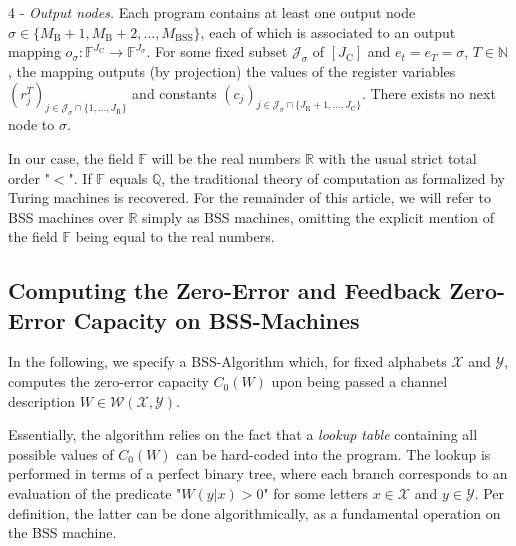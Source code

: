 \documentclass[conference]{IEEEtran}
\def\X{{\mathcal X}}
\def\Y{{\mathcal Y}}
\def\J{{\mathcal J}}
\def\W{{\mathcal W}}
\def\NN{{\mathbb N}}
\def\RR{{\mathbb R}}
\def\ZZ{{\mathbb Z}}
\def\FF{{\mathbb F}}
\newcommand{\BSS}{\mathrm{BSS}}
\newcommand{\revision}[1]{}
\begin{document}
	4 - \emph{Output nodes.} Each program contains at least one output node \(\sigma \in \{M_{\mathrm{B}} + 1, M_{\mathrm{B}} + 2,\ldots, M_\BSS\}\), 
		each of which is associated to an output mapping
		\(	o_\sigma : \FF^{J_{\mathrm{C}}}\rightarrow \FF^{J_{\sigma}}.
		\)
		For some fixed subset \(\J_\sigma\) of \([J_\mathrm{C}]\) and \(e_t = e_T = \sigma\), \(T\in\NN\), the mapping outputs (by projection) the values of the 
		register variables \((r_j^T)_{j\in \J_\sigma \cap \{1,\ldots,J_\mathrm{R}\}}\) and constants \((c_j)_{j\in \J_\sigma \cap \{J_\mathrm{R}+1,\ldots,J_\mathrm{C}\}}\). 
		There exists no next node to \(\sigma\).

	In our case, the field \(\FF\) will be the real numbers \(\RR\) with the usual strict total order "\(<\)". If \(\FF\) equals \(\mathbb{Q}\),
	the traditional theory of computation as formalized by Turing machines is recovered. For the remainder of this article, we will refer to BSS machines over \(\RR\) 
	simply as BSS machines, omitting the explicit mention of the field \(\FF\) being equal to the real numbers. 
	
	\subsection{Computing the Zero-Error and Feedback Zero-Error Capacity on BSS-Machines}
	\revision{Computing the Zero-Error capacity is an unsolved problem on Turing machines!}
	\noindent In the following, we specify a BSS-Algorithm which, for fixed alphabets \(\X\) and \(\Y\), computes the zero-error capacity \(C_0(W)\) 
	upon being passed a channel description \(W \in \W(\X,\Y)\). 

	Essentially, the algorithm relies on the fact that a \emph{lookup table} containing all possible values of \(C_0(W)\) can be hard-coded into the program. The lookup is performed in 
	terms of a perfect binary tree, where each branch corresponds to an evaluation of the predicate "\(W(y|x) > 0\)" for some letters \(x\in\X\) and \(y\in\Y\). Per definition, the latter 
	can be done algorithmically, as a fundamental operation on the BSS machine.
\end{document}
